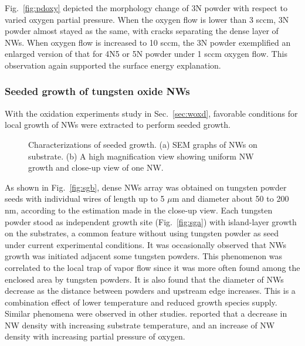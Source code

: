 Fig.~\ref{fig:pdoxy} depicted the morphology change of 3N powder with respect to varied oxygen partial pressure. When the oxygen flow is lower than 3 sccm, 3N powder almost stayed as the same, with cracks separating the dense layer of NWs. When oxygen flow is increased to 10 sccm, the 3N powder exemplified an enlarged version of that for 4N5 or 5N powder under 1 sccm oxygen flow. This observation again supported the surface energy explanation.

\subsubsection{Seeded growth of tungsten oxide NWs}
With the oxidation experiments study in Sec.~\ref{sec:woxd}, favorable conditions for local growth of NWs were extracted to perform seeded growth. 

\begin{figure}[htb]
\centering
{}\hspace{0.04\textwidth}
\caption[Characterization of seeded growth : SEM]{Characterizations of seeded growth. (a) SEM graphs of  NWs on  substrate. (b) A high magnification view showing uniform NW growth and close-up view of one NW. }
\label{fig:woseedsem}
\end{figure}

As shown in Fig.~\ref{fig:sgb}, dense NWs array was obtained on tungsten powder seeds with individual wires of length up to 5 $\mu$m and diameter about 50 to 200 nm, according to the estimation made in the close-up view. Each tungsten powder stood as independent growth site (Fig.~\ref{fig:sga}) with island-layer growth on the substrates, a common feature without using tungsten powder as seed under current experimental conditions. It was occasionally observed that NWs growth was initiated adjacent some tungsten powders. This phenomenon was correlated to the local trap of vapor flow since it was more often found among the enclosed area by tungsten powders. It is also found that the diameter of NWs decrease as the distance between powders and upstream edge increases. This is a combination effect of lower temperature and reduced  growth species supply. Similar phenomena were observed in other studies. \citeauthor{Thangala2007} reported that a decrease in NW density with increasing substrate temperature, and an increase of NW density with increasing partial pressure of oxygen.\cite{Thangala2007}

